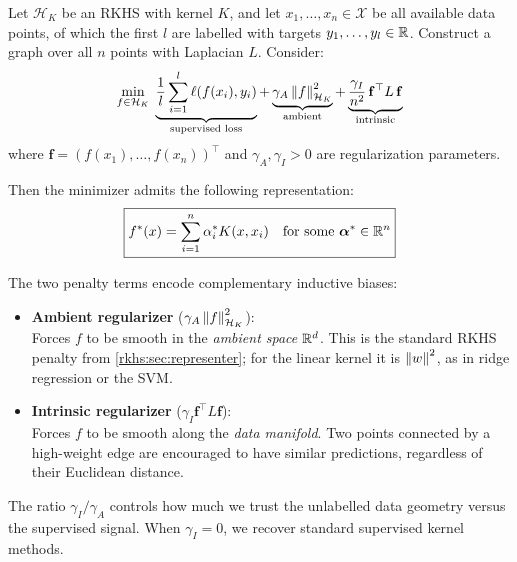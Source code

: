 \begin{notechapter}
\begin{theorem}
\label{semi-supervised-graphs:thm:manifold_reg}
Let $\mathcal{H}_K$ be an RKHS with kernel $K$, and let $x_1,\ldots,x_n \in \mathcal{X}$
be all available data points, of which the first $l$ are labelled with
targets $y_1,\ldots,y_l \in \mathbb{R}$. Construct a graph over all $n$ points
with Laplacian $L$. Consider:
\begin{equation}
\label{semi-supervised-graphs:eq:manifold_reg}
\min_{f \in \mathcal{H}_K}\;
\underbrace{\frac{1}{l}\sum_{i=1}^{l}\ell(f(x_i), y_i)}_{\text{supervised loss}}
+ \underbrace{\gamma_A\left\|f\right\|_{\mathcal{H}_K}^2}_{\text{ambient}}
+ \underbrace{\frac{\gamma_I}{n^2}\,\mathbf{f}^\top L\,\mathbf{f}}_{\text{intrinsic}}
\end{equation}
where $\mathbf{f} = (f(x_1), \ldots, f(x_n))^\top$ and
$\gamma_A, \gamma_I > 0$ are regularization parameters.

Then the minimizer admits the following representation:
\begin{equation}
\label{semi-supervised-graphs:eq:manifold_solution}
\boxed{f^*(x) = \sum_{i=1}^n \alpha_i^* K(x, x_i)
\quad \text{for some } \boldsymbol{\alpha}^* \in \mathbb{R}^n}
\end{equation}
\end{theorem}

\begin{intuition}
The two penalty terms encode complementary inductive biases:

\begin{itemize}
  \item \textbf{Ambient regularizer} ($\gamma_A\left\|f\right\|_{\mathcal{H}_K}^2$): \\
  Forces $f$ to be smooth in the \emph{ambient space} $\mathbb{R}^d$. This is
  the standard RKHS penalty from \cref{rkhs:sec:representer}; for the linear
  kernel it is $\left\|w\right\|^2$, as in ridge regression or the SVM.

  \item \textbf{Intrinsic regularizer} ($\gamma_I \mathbf{f}^\top L \mathbf{f}$): \\
  Forces $f$ to be smooth along the \emph{data manifold}. Two points
  connected by a high-weight edge are encouraged to have similar
  predictions, regardless of their Euclidean distance.
\end{itemize}

The ratio $\gamma_I / \gamma_A$ controls how much we trust the
unlabelled data geometry versus the supervised signal. When
$\gamma_I = 0$, we recover standard supervised kernel methods.
\end{intuition}


\end{notechapter}
